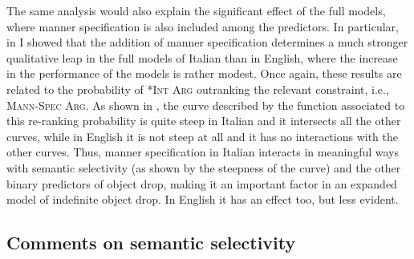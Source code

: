 The same analysis would also explain the significant effect of the full models, where manner specification is also included among the predictors. In particular, in  I showed that the addition of manner specification determines a much stronger qualitative leap in the full models of Italian than in English, where the increase in the performance of the models is rather modest. Once again, these results are related to the probability of \textsc{*Int Arg} outranking the relevant constraint, i.e., \textsc{Mann-Spec Arg}. As shown in , the curve described by the function associated to this re-ranking probability is quite steep in Italian and it intersects all the other curves, while in English it is not steep at all and it has no interactions with the other curves. Thus, manner specification in Italian interacts in meaningful ways with semantic selectivity (as shown by the steepness of the curve) and the other binary predictors of object drop, making it an important factor in an expanded model of indefinite object drop. In English it has an effect too, but less evident.


\subsection{Comments on semantic selectivity}


